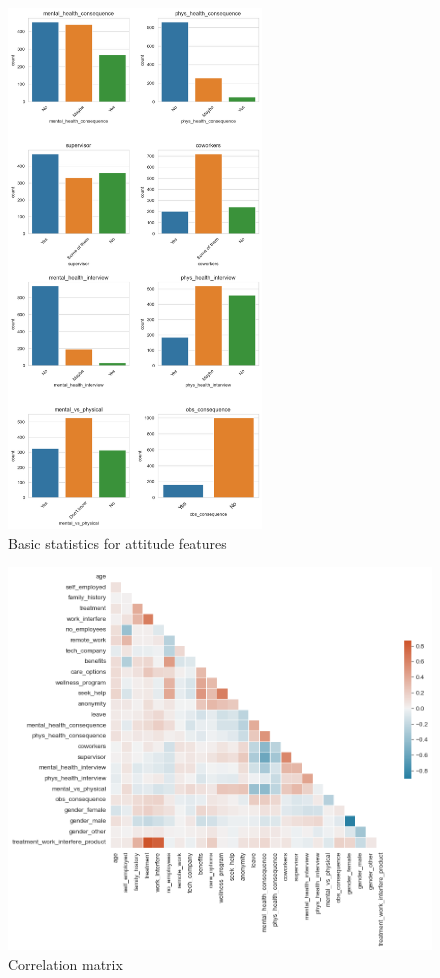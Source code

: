 \documentclass[conference]{IEEEtran}
\begin{document}
\begin{figure}
    \includegraphics[width=0.6\textwidth]{images/attitude.png}
    \centering
    \caption{Basic statistics for attitude features}
\end{figure}
\begin{figure}
    \centering
    \includegraphics[width=\textwidth]{images/corr-matrix.png}
    \caption{Correlation matrix}
\end{figure}
\end{document}
